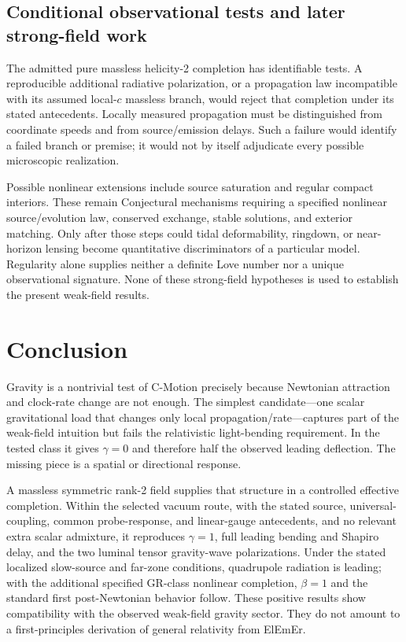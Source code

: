 \documentclass[11pt]{article}
\newcommand{\cmotion}{\mbox{C-Motion}}
\newcommand{\ElEmEr}{\mbox{ElEmEr}}
\theoremstyle{plain}
\theoremstyle{remark}
\begin{document}
\subsection{Conditional observational tests and later strong-field work}
\label{sec:conditional-tests}

The admitted pure massless helicity-2 completion has identifiable tests.
A reproducible additional radiative polarization, or a propagation law
incompatible with its assumed local-$c$ massless branch, would reject that
completion under its stated antecedents.  Locally measured propagation
must be distinguished from coordinate speeds and from source/emission
delays.  Such a failure would identify a failed branch or premise; it would
not by itself adjudicate every possible microscopic realization.

Possible nonlinear extensions include source saturation and regular
compact interiors.  These remain Conjectural mechanisms requiring a
specified nonlinear source/evolution law, conserved exchange, stable
solutions, and exterior matching.  Only after those steps could tidal
deformability, ringdown, or near-horizon lensing become quantitative
discriminators of a particular model.  Regularity alone supplies neither
a definite Love number nor a unique observational signature.  None of
these strong-field hypotheses is used to establish the present weak-field
results.

\section{Conclusion}
\label{sec:conclusion}

Gravity is a nontrivial test of \cmotion{} precisely because Newtonian attraction and
clock-rate change are not enough.  The simplest candidate---one scalar gravitational load
that changes only local propagation/rate---captures part of the weak-field intuition but
fails the relativistic light-bending requirement.  In the tested class it gives
$\gamma=0$ and therefore half the observed leading deflection.  The missing piece is a
spatial or directional response.

A massless symmetric rank-2 field supplies that structure in a controlled effective
completion.  Within the selected vacuum route, with the stated source,
universal-coupling, common
probe-response, and linear-gauge antecedents, and no relevant extra scalar
admixture, it reproduces $\gamma=1$, full leading bending and Shapiro delay,
and the two luminal tensor gravity-wave polarizations.  Under the stated
localized slow-source and far-zone conditions, quadrupole radiation is
leading; with the additional specified GR-class nonlinear completion,
$\beta=1$ and the standard first post-Newtonian behavior follow.  These positive results show compatibility with the
observed weak-field gravity sector.  They do not amount to a first-principles derivation
of general relativity from \ElEmEr{}.
\end{document}
